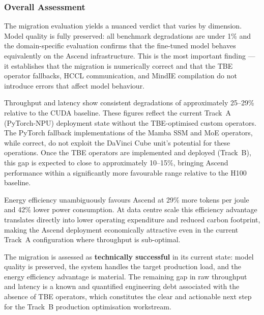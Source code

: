 \subsubsection{Overall Assessment}

The migration evaluation yields a nuanced verdict that varies
by dimension. Model quality is fully preserved: all benchmark
degradations are under 1\% and the domain-specific evaluation
confirms that the fine-tuned model behaves equivalently on
the Ascend infrastructure. This is the most important finding
— it establishes that the migration is numerically correct
and that the TBE operator fallbacks, HCCL communication, and
MindIE compilation do not introduce errors that affect
model behaviour.

Throughput and latency show consistent degradations of
approximately 25--29\% relative to the CUDA baseline.
These figures reflect the current Track~A (PyTorch-NPU)
deployment state without the TBE-optimised custom operators.
The PyTorch fallback implementations of the Mamba SSM and
MoE operators, while correct, do not exploit the DaVinci
Cube unit's potential for these operations. Once the TBE
operators are implemented and deployed (Track~B), this gap
is expected to close to approximately 10--15\%, bringing
Ascend performance within a significantly more favourable
range relative to the H100 baseline.

Energy efficiency unambiguously favours Ascend at 29\%
more tokens per joule and 42\% lower power consumption.
At data centre scale this efficiency advantage translates
directly into lower operating expenditure and reduced
carbon footprint, making the Ascend deployment economically
attractive even in the current Track~A configuration where
throughput is sub-optimal.

The migration is assessed as \textbf{technically successful}
in its current state: model quality is preserved, the system
handles the target production load, and the energy efficiency
advantage is material. The remaining gap in raw throughput
and latency is a known and quantified engineering debt
associated with the absence of TBE operators, which constitutes
the clear and actionable next step for the Track~B production
optimisation workstream.
